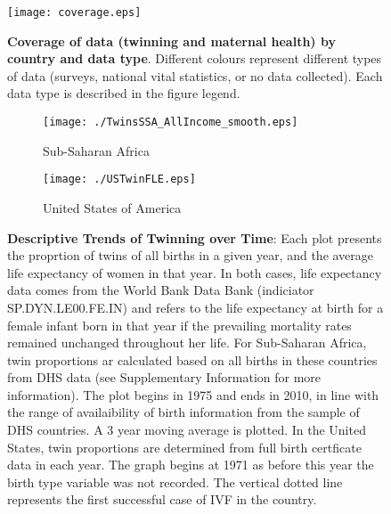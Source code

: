 \documentclass{nature}
\begin{document}
\begin{linenumbers}
\begin{spacing}{1}
\begin{figure}[htpb!]
\texttt{[image: coverage.eps]}
\caption{\textbf{Coverage of data (twinning and maternal health) by country and data type}. {\footnotesize  Different colours represent different types of data (surveys, national vital statistics, or no data collected).  Each data type is described in the figure legend.}}
\label{fig:twincoverage}
\end{figure}


\begin{figure}[htpb!]
\begin{subfigure}{.5\textwidth}
  \texttt{[image: ./TwinsSSA\_AllIncome\_smooth.eps]}
   \caption{Sub-Saharan Africa}
\end{subfigure}%
\begin{subfigure}{.5\textwidth}
  \texttt{[image: ./USTwinFLE.eps]}
  \caption{United States of America}
\end{subfigure}
\caption{\textbf{Descriptive Trends of Twinning over Time}: {\footnotesize Each plot presents the proprtion of
twins of all births in a given year, and the average life expectancy of women in that year. In
both cases, life expectancy data comes from the World Bank Data Bank (indiciator SP.DYN.LE00.FE.IN) and refers to the life expectancy at birth for a female infant born in that year if the prevailing mortality rates remained unchanged throughout her life.  For Sub-Saharan Africa, twin proportions ar calculated based on all births in these countries from DHS data (see Supplementary Information for more information).  The plot begins in 1975 and ends in 2010, in line with the range of availaibility of birth information from the sample of DHS countries.  A 3 year moving average is plotted.  In the United States, twin proportions are determined from full birth certficate data in each year.  The graph begins at 1971 as before this year the birth type variable was not recorded.  The vertical dotted line represents the first successful case of IVF in the country.}}
\end{figure}

\clearpage
\thispagestyle{empty}









\end{spacing}
\end{linenumbers}
\end{document}

